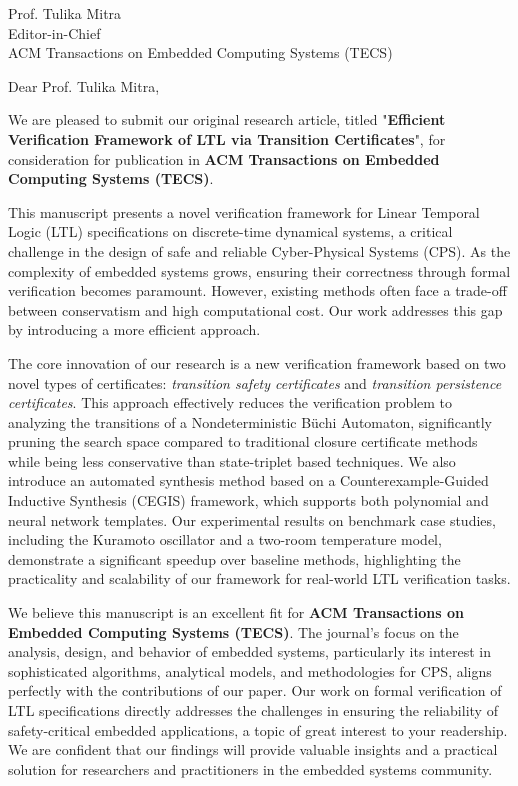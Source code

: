 \documentclass[11pt]{letter}
\newcommand{\EditorName}{Prof. Tulika Mitra}
\newcommand{\EditorTitle}{Editor-in-Chief}
\newcommand{\JournalName}{ACM Transactions on Embedded Computing Systems (TECS)}
\newcommand{\ManuscriptTitle}{Efficient Verification Framework of LTL via Transition Certificates}
\begin{document}
\begin{letter}{\EditorName \\ \EditorTitle \\ \JournalName}


\opening{Dear \EditorName,}

We are pleased to submit our original research article, titled "\textbf{\ManuscriptTitle}", for consideration for publication in \textbf{\JournalName}.

This manuscript presents a novel verification framework for Linear Temporal Logic (LTL) specifications on discrete-time dynamical systems, a critical challenge in the design of safe and reliable Cyber-Physical Systems (CPS). As the complexity of embedded systems grows, ensuring their correctness through formal verification becomes paramount. However, existing methods often face a trade-off between conservatism and high computational cost. Our work addresses this gap by introducing a more efficient approach.

The core innovation of our research is a new verification framework based on two novel types of certificates: \textit{transition safety certificates} and \textit{transition persistence certificates}. This approach effectively reduces the verification problem to analyzing the transitions of a Nondeterministic Büchi Automaton, significantly pruning the search space compared to traditional closure certificate methods while being less conservative than state-triplet based techniques. We also introduce an automated synthesis method based on a Counterexample-Guided Inductive Synthesis (CEGIS) framework, which supports both polynomial and neural network templates. Our experimental results on benchmark case studies, including the Kuramoto oscillator and a two-room temperature model, demonstrate a significant speedup over baseline methods, highlighting the practicality and scalability of our framework for real-world LTL verification tasks.

We believe this manuscript is an excellent fit for \textbf{\JournalName}. The journal's focus on the analysis, design, and behavior of embedded systems, particularly its interest in sophisticated algorithms, analytical models, and methodologies for CPS, aligns perfectly with the contributions of our paper. Our work on formal verification of LTL specifications directly addresses the challenges in ensuring the reliability of safety-critical embedded applications, a topic of great interest to your readership. We are confident that our findings will provide valuable insights and a practical solution for researchers and practitioners in the embedded systems community.


\end{letter}
\end{document}
